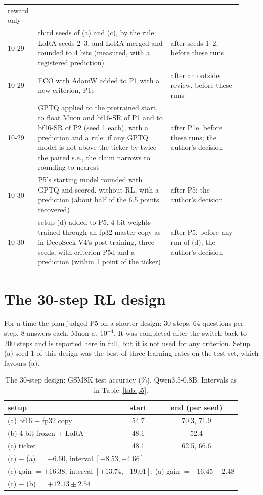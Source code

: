 \documentclass[11pt]{article}
\begin{document}
\begin{table}[!htbp]
\begin{tabular}{p{0.11\linewidth}p{0.52\linewidth}p{0.29\linewidth}}
reward only \\
10-29 & third seeds of (a) and (c), by the rule; LoRA seeds 2--3, and LoRA merged and rounded to 4 bits (measured,
with a registered prediction) & after seeds 1--2, before these runs \\
10-29 & ECO with AdamW added to P1 with a new criterion, P1e & after an outside review, before these runs \\
10-29 & GPTQ applied to the pretrained start, to float Muon and bf16-SR of P1 and to bf16-SR of P2 (seed 1 each),
with a prediction and a rule: if any GPTQ model is not above the ticker by twice the paired s.e., the claim narrows to
rounding to nearest & after P1e, before these runs; the author's decision \\
10-30 & P5's starting model rounded with GPTQ and scored, without RL, with a prediction (about half of the 6.5 points
recovered) & after P5; the author's decision \\
10-30 & setup (d) added to P5, 4-bit weights trained through an fp32 master copy as in DeepSeek-V4's post-training,
three seeds, with criterion P5d and a prediction (within 1 point of the ticker) & after P5, before any run of (d); the
author's decision \\
\bottomrule
\end{tabular}
\end{table}

\FloatBarrier
\section{The 30-step RL design}\label{app:p5short}
For a time the plan judged P5 on a shorter design: 30 steps, 64 questions per step, 8 answers each, Muon at $10^{-4}$.
It was completed after the switch back to 200 steps and is reported here in full, but it is not used for any
criterion. Setup (a) seed 1 of this design was the best of three learning rates on the test set, which favours (a).

\begin{table}[!htbp]
\centering
\caption{The 30-step design: GSM8K test accuracy (\%), Qwen3.5-0.8B. Intervals as in Table~\ref{tab:p5}.}
\label{tab:p5short}
\small
\begin{tabular}{lcc}
\toprule
setup & start & end (per seed) \\
\midrule
(a) bf16 + fp32 copy & 54.7 & 70.3, 71.9 \\
(b) 4-bit frozen + LoRA & 48.1 & 52.4 \\
(c) ticker & 48.1 & 62.5, 66.6 \\
\midrule
\multicolumn{3}{l}{(c) $-$ (a) $= -6.60$, interval $[-8.53, -4.66]$}\\
\multicolumn{3}{l}{(c) gain $= +16.38$, interval $[+13.74, +19.01]$; (a) gain $= +16.45 \pm 2.48$}\\
\multicolumn{3}{l}{(c) $-$ (b) $= +12.13 \pm 2.54$}\\
\bottomrule
\end{tabular}
\end{table}
\end{document}

